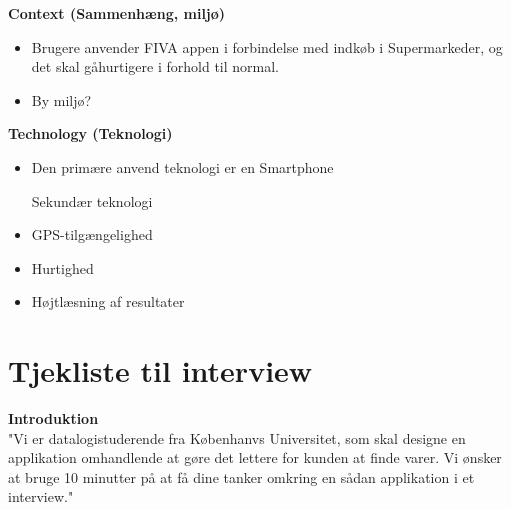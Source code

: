 \documentclass[12pt]{article}
\begin{document}
\textbf{Context (Sammenh\ae ng, milj\o )}
\begin{itemize}
Prim\ae r sammenh\ae ng 
\item Brugere anvender FIVA appen i forbindelse med indk\o b i Supermarkeder, og det skal g\aa hurtigere i forhold til normal.
\item By milj\o  ?
\end{itemize}

\textbf{Technology (Teknologi)}
\begin{itemize}
Prim\ae r teknologi
\item Den prim\ae re anvend teknologi er en Smartphone 

Sekund\ae r teknologi
\item GPS-tilgængelighed
\item Hurtighed
\item Højtlæsning af resultater
\end{itemize}

\newpage

\section*{Tjekliste til interview}
\textbf{Introduktion}\\
"Vi er datalogistuderende fra Københanvs Universitet, som skal designe en applikation omhandlende at gøre det lettere for kunden at finde varer. Vi ønsker at bruge 10 minutter på at få dine tanker omkring en sådan applikation  i et interview."
 
\end{document}
